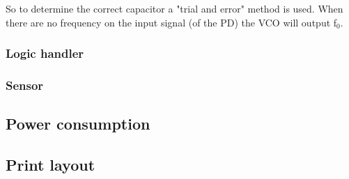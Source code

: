 So to determine the correct capacitor a "trial and error" method is used. When there are no frequency on the input signal (of the PD) the VCO will output f$_{\text{0}}$.

\subsubsection{Logic handler}

\subsubsection{Sensor}



\subsection{Power consumption}


\subsection{Print layout}







